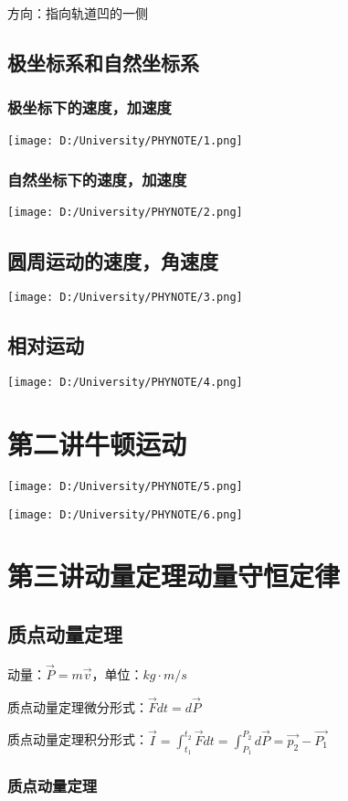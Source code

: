 \documentclass[UTF8]{article}
\begin{document}
    \;\;方向：指向轨道凹的一侧

\subsection{极坐标系和自然坐标系}
\subsubsection{极坐标下的速度，加速度}
\texttt{[image: D:/University/PHYNOTE/1.png]}
\subsubsection{自然坐标下的速度，加速度}
\texttt{[image: D:/University/PHYNOTE/2.png]}
\subsection{圆周运动的速度，角速度}
\texttt{[image: D:/University/PHYNOTE/3.png]}
\subsection{相对运动}
\texttt{[image: D:/University/PHYNOTE/4.png]}
\newpage
\section{第二讲\;\;牛顿运动}
\texttt{[image: D:/University/PHYNOTE/5.png]}

\texttt{[image: D:/University/PHYNOTE/6.png]}
\newpage
\section{第三讲\;\;动量定理\;\;动量守恒定律}
\subsection{质点动量定理}

    动量：$\vec{P} = m\vec{v}$，单位：$kg\cdot m/s$
    
    质点动量定理微分形式：$\vec{F}dt = d\vec{P}$

    质点动量定理积分形式：$\vec{I} = \int_{t_1}^{t_2}\vec{F}dt = \int_{P_1}^{P_2}d\vec{P} = \vec{p_2} - \vec{P_1}$

\subsubsection{质点动量定理}
\end{document}
